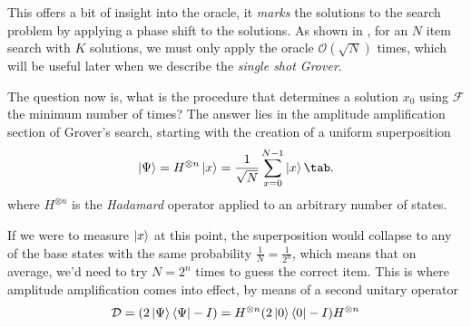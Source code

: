         This offers a bit of insight into the oracle, it \textit{marks} the solutions to the search problem by applying a phase shift to the solutions. 
        As shown in \cite{BBHT96}, for an $N$ item search with $K$ solutions, we must only apply the oracle $\mathcal{O}(\sqrt{N})$ times, which will be useful later when we describe the \textit{single shot Grover}.\par
        The question now is, what is the procedure that determines a solution $x_0$ using $\mathcal{F}$ the minimum number of times? The answer lies in the amplitude amplification section of Grover's search, starting with the creation of a uniform superposition
                     \begin{equation}
                         \ket{\Psi} = H^{\otimes n}\ket{x} = \frac{1}{\sqrt{N}}\sum_{x=0}^{N-1} \ket{x}\tab.
                     \end{equation}
         where $H^{\otimes n}$ is the \textit{Hadamard} operator applied to an arbitrary number of states.\par
         If we were to measure $\ket{x}$ at this point, the superposition would collapse to any of the base states with the same probability $\frac{1}{N} = \frac{1}{2^n}$, which means that on average, we'd need to try $N = 2^n$ times to guess the correct item. 
         This is where amplitude amplification comes into effect, by means of a second unitary operator
                    \begin{equation}
                         \mathcal{D} = (2\ket{\Psi}\bra{\Psi} - I) = H^{\otimes n}(2\ket{0}\bra{0} - I)H^{\otimes n}   
                      \end{equation}
        
